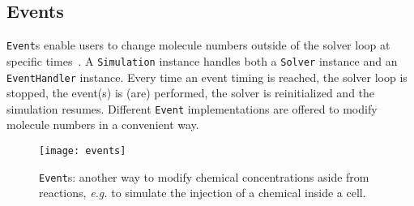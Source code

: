 \subsection{Events}

\texttt{Event}s enable users to change molecule numbers outside of the solver loop
at specific times~.
A \texttt{Simulation} instance handles both a \texttt{Solver} instance and
an \texttt{EventHandler} instance.
Every time an event timing is reached, the solver loop is stopped,
the event(s) is (are) performed, the solver is reinitialized and the simulation resumes.
Different \texttt{Event} implementations are offered to modify molecule numbers in a convenient way.

\begin{figure}[!h]
  \centering
  \texttt{[image: events]}
  \caption{
  \texttt{Event}s: another way to modify chemical concentrations aside from reactions,
  \textit{e.g.} to simulate the injection of a chemical inside a cell.
  }
\label{fig:events}
\end{figure}
